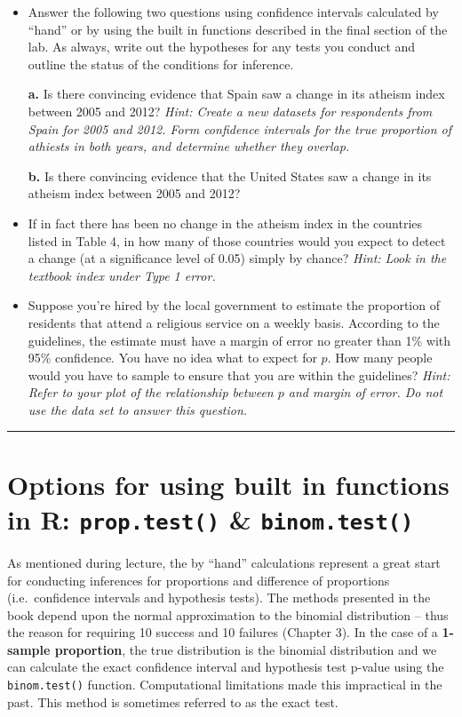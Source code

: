 \documentclass[]{book}
\theoremstyle{definition}
\theoremstyle{definition}
\theoremstyle{definition}
\theoremstyle{remark}
\begin{document}
\begin{itemize}
\item
  Answer the following two questions using confidence intervals
  calculated by ``hand'' or by using the built in functions described in
  the final section of the lab. As always, write out the hypotheses for
  any tests you conduct and outline the status of the conditions for
  inference.

  \textbf{a.} Is there convincing evidence that Spain saw a change in
  its atheism index between 2005 and 2012? \emph{Hint: Create a new
  datasets for respondents from Spain for 2005 and 2012. Form confidence
  intervals for the true proportion of athiests in both years, and
  determine whether they overlap.}

  \textbf{b.} Is there convincing evidence that the United States saw a
  change in its atheism index between 2005 and 2012?
\item
  If in fact there has been no change in the atheism index in the
  countries listed in Table 4, in how many of those countries would you
  expect to detect a change (at a significance level of 0.05) simply by
  chance? \emph{Hint: Look in the textbook index under Type 1 error.}
\item
  Suppose you're hired by the local government to estimate the
  proportion of residents that attend a religious service on a weekly
  basis. According to the guidelines, the estimate must have a margin of
  error no greater than 1\% with 95\% confidence. You have no idea what
  to expect for \(p\). How many people would you have to sample to
  ensure that you are within the guidelines? \emph{Hint: Refer to your
  plot of the relationship between \(p\) and margin of error. Do not use
  the data set to answer this question.}
\end{itemize}

\begin{center}\rule{0.5\linewidth}{\linethickness}\end{center}

\section{\texorpdfstring{Options for using built in functions in R:
\texttt{prop.test()} \&
\texttt{binom.test()}}{Options for using built in functions in R: prop.test() \& binom.test()}}\label{options-for-using-built-in-functions-in-r-prop.test-binom.test}

As mentioned during lecture, the by ``hand'' calculations represent a
great start for conducting inferences for proportions and difference of
proportions (i.e.~confidence intervals and hypothesis tests). The
methods presented in the book depend upon the normal approximation to
the binomial distribution -- thus the reason for requiring 10 success
and 10 failures (Chapter 3). In the case of a \textbf{1-sample
proportion}, the true distribution is the binomial distribution and we
can calculate the exact confidence interval and hypothesis test p-value
using the \texttt{binom.test()} function. Computational limitations made
this impractical in the past. This method is sometimes referred to as
the exact test.
\end{document}
